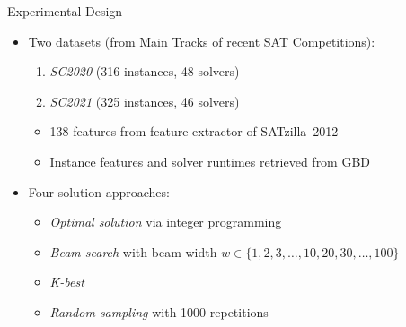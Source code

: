 \documentclass[en]{sdqbeamer}
\begin{document}
\begin{frame}[t]{Experimental Design}
	\begin{itemize}
		\item Two datasets (from Main Tracks of recent SAT Competitions):
		\begin{enumerate}[1)]
			\item \emph{SC2020} (316 instances, 48 solvers)~\cite{balyo2020proceedings}
			\item \emph{SC2021} (325 instances, 46 solvers)~\cite{balyo2021proceedings}
		\end{enumerate}
		\begin{itemize}
			\item 138 features from feature extractor of SATzilla~2012~\cite{xu2012features, xu2012satzilla2012}
			\item Instance features and solver runtimes retrieved from GBD~\cite{iser2020collaborative}
		\end{itemize}
		\pause
		\vspace{\baselineskip}
		\item Four solution approaches:
		\begin{itemize}
			\item \emph{Optimal solution} via integer programming~\cite{python-mip}
			\item \emph{Beam search} with beam width $w \in \{1, 2, 3, \dots, 10, 20, 30, \dots, 100\}$
			\item \emph{K-best}
			\item \emph{Random sampling} with 1000 repetitions
		\end{itemize}

\end{itemize}
\end{frame}
\end{document}
